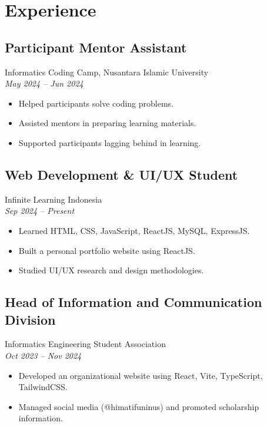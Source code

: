 \section*{Experience}

\subsection*{Participant Mentor Assistant}
Informatics Coding Camp, Nusantara Islamic University \\
\textit{May 2024 -- Jun 2024}
\begin{itemize}
    \item Helped participants solve coding problems.
    \item Assisted mentors in preparing learning materials.
    \item Supported participants lagging behind in learning.
\end{itemize}

\subsection*{Web Development \& UI/UX Student}
Infinite Learning Indonesia \\
\textit{Sep 2024 -- Present}
\begin{itemize}
    \item Learned HTML, CSS, JavaScript, ReactJS, MySQL, ExpressJS.
    \item Built a personal portfolio website using ReactJS.
    \item Studied UI/UX research and design methodologies.
\end{itemize}

\subsection*{Head of Information and Communication Division}
Informatics Engineering Student Association \\
\textit{Oct 2023 -- Nov 2024}
\begin{itemize}
    \item Developed an organizational website using React, Vite, TypeScript, TailwindCSS.
    \item Managed social media (@himatifuninus) and promoted scholarship information.
\end{itemize}
